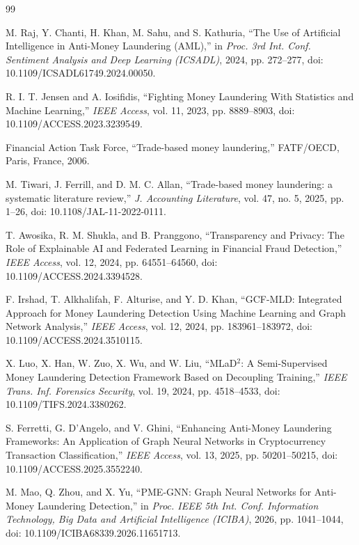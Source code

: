 \documentclass[journal]{IEEEtran}
\begin{document}
\begin{thebibliography}{99}

M. Raj, Y. Chanti, H. Khan, M. Sahu, and S. Kathuria, ``The Use of Artificial Intelligence in Anti-Money Laundering (AML),'' in \emph{Proc. 3rd Int. Conf. Sentiment Analysis and Deep Learning (ICSADL)}, 2024, pp. 272--277, doi: 10.1109/ICSADL61749.2024.00050.

R. I. T. Jensen and A. Iosifidis, ``Fighting Money Laundering With Statistics and Machine Learning,'' \emph{IEEE Access}, vol. 11, 2023, pp. 8889--8903, doi: 10.1109/ACCESS.2023.3239549.

Financial Action Task Force, ``Trade-based money laundering,'' FATF/OECD, Paris, France, 2006.

M. Tiwari, J. Ferrill, and D. M. C. Allan, ``Trade-based money laundering: a systematic literature review,'' \emph{J. Accounting Literature}, vol. 47, no. 5, 2025, pp. 1--26, doi: 10.1108/JAL-11-2022-0111.

T. Awosika, R. M. Shukla, and B. Pranggono, ``Transparency and Privacy: The Role of Explainable AI and Federated Learning in Financial Fraud Detection,'' \emph{IEEE Access}, vol. 12, 2024, pp. 64551--64560, doi: 10.1109/ACCESS.2024.3394528.

F. Irshad, T. Alkhalifah, F. Alturise, and Y. D. Khan, ``GCF-MLD: Integrated Approach for Money Laundering Detection Using Machine Learning and Graph Network Analysis,'' \emph{IEEE Access}, vol. 12, 2024, pp. 183961--183972, doi: 10.1109/ACCESS.2024.3510115.

X. Luo, X. Han, W. Zuo, X. Wu, and W. Liu, ``MLaD$^2$: A Semi-Supervised Money Laundering Detection Framework Based on Decoupling Training,'' \emph{IEEE Trans. Inf. Forensics Security}, vol. 19, 2024, pp. 4518--4533, doi: 10.1109/TIFS.2024.3380262.

S. Ferretti, G. D'Angelo, and V. Ghini, ``Enhancing Anti-Money Laundering Frameworks: An Application of Graph Neural Networks in Cryptocurrency Transaction Classification,'' \emph{IEEE Access}, vol. 13, 2025, pp. 50201--50215, doi: 10.1109/ACCESS.2025.3552240.

M. Mao, Q. Zhou, and X. Yu, ``PME-GNN: Graph Neural Networks for Anti-Money Laundering Detection,'' in \emph{Proc. IEEE 5th Int. Conf. Information Technology, Big Data and Artificial Intelligence (ICIBA)}, 2026, pp. 1041--1044, doi: 10.1109/ICIBA68339.2026.11651713.


\end{thebibliography}
\end{document}
